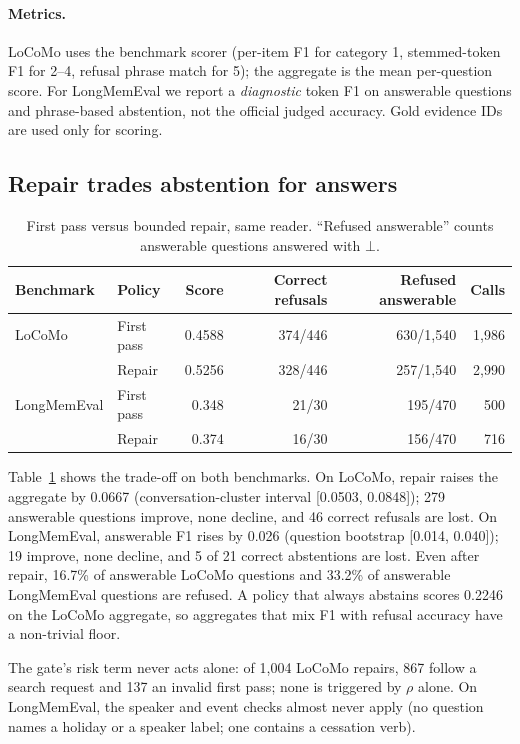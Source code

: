 \documentclass[10pt]{article}
\theoremstyle{plain}
\theoremstyle{definition}
\theoremstyle{remark}
\begin{document}
\paragraph{Metrics.}
LoCoMo uses the benchmark scorer (per-item F1 for category 1, stemmed-token F1
for 2--4, refusal phrase match for 5); the aggregate is the mean per-question
score. For LongMemEval we report a \emph{diagnostic} token F1 on answerable
questions and phrase-based abstention, not the official judged accuracy. Gold
evidence IDs are used only for scoring.

\subsection{Repair trades abstention for answers}

\begin{table}[t]
\centering
\caption{First pass versus bounded repair, same reader. ``Refused answerable''
counts answerable questions answered with $\bot$.}
\label{tab:tradeoff}
\small
\begin{tabular}{llrrrr}
\toprule
Benchmark & Policy & Score & Correct refusals & Refused answerable & Calls \\
\midrule
LoCoMo & First pass & 0.4588 & 374/446 & 630/1,540 & 1,986 \\
       & Repair & 0.5256 & 328/446 & 257/1,540 & 2,990 \\
LongMemEval & First pass & 0.348 & 21/30 & 195/470 & 500 \\
            & Repair & 0.374 & 16/30 & 156/470 & 716 \\
\bottomrule
\end{tabular}
\end{table}

Table~\ref{tab:tradeoff} shows the trade-off on both benchmarks. On LoCoMo, repair
raises the aggregate by 0.0667 (conversation-cluster interval [0.0503, 0.0848]);
279 answerable questions improve, none decline, and 46 correct refusals are lost.
On LongMemEval, answerable F1 rises by 0.026 (question bootstrap [0.014, 0.040]);
19 improve, none decline, and 5 of 21 correct abstentions are lost. Even after
repair, 16.7\% of answerable LoCoMo questions and 33.2\% of answerable LongMemEval
questions are refused. A policy that always abstains scores 0.2246 on the LoCoMo
aggregate, so aggregates that mix F1 with refusal accuracy have a non-trivial floor.

The gate's risk term never acts alone: of 1,004 LoCoMo repairs, 867 follow a
search request and 137 an invalid first pass; none is triggered by $\rho$ alone.
On LongMemEval, the speaker and event checks almost never apply (no question names
a holiday or a speaker label; one contains a cessation verb).
\end{document}
